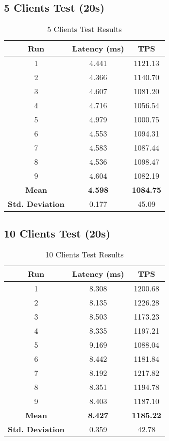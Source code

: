 \subsection{5 Clients Test (20s)}
\begin{table}[H]
\centering
\begin{tabular}{|c|c|c|}
\hline
\textbf{Run} & \textbf{Latency (ms)} & \textbf{TPS} \\
\hline
1 & 4.441 & 1121.13 \\
2 & 4.366 & 1140.70 \\
3 & 4.607 & 1081.20 \\
4 & 4.716 & 1056.54 \\
5 & 4.979 & 1000.75 \\
6 & 4.553 & 1094.31 \\
7 & 4.583 & 1087.44 \\
8 & 4.536 & 1098.47 \\
9 & 4.604 & 1082.19 \\
\hline
\textbf{Mean} & \textbf{4.598} & \textbf{1084.75} \\
\textbf{Std. Deviation} & 0.177 & 45.09 \\
\hline
\end{tabular}
\caption{5 Clients Test Results}
\end{table}

\subsection{10 Clients Test (20s)}
\begin{table}[H]
\centering
\begin{tabular}{|c|c|c|}
\hline
\textbf{Run} & \textbf{Latency (ms)} & \textbf{TPS} \\
\hline
1 & 8.308 & 1200.68 \\
2 & 8.135 & 1226.28 \\
3 & 8.503 & 1173.23 \\
4 & 8.335 & 1197.21 \\
5 & 9.169 & 1088.04 \\
6 & 8.442 & 1181.84 \\
7 & 8.192 & 1217.82 \\
8 & 8.351 & 1194.78 \\
9 & 8.403 & 1187.10 \\
\hline
\textbf{Mean} & \textbf{8.427} & \textbf{1185.22} \\
\textbf{Std. Deviation} & 0.359 & 42.78 \\
\hline
\end{tabular}
\caption{10 Clients Test Results}
\end{table}

